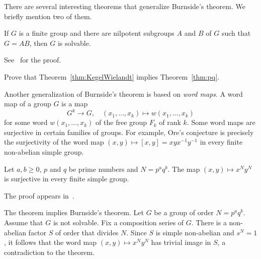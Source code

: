 
\begin{optional}
There are several interesting theorems that generalize Burnside’s theorem. 
We briefly mention two of them.

\begin{theorem}
    \label{thm:KegelWielandt}
    If $G$ is a finite group and there are nilpotent subgroups 
    $A$ and $B$ of $G$ such that 
    $G=AB$, then $G$ is solvable.
\end{theorem}

See~\cite[Theorem 2.4.3]{MR1211633} for the proof.

 \begin{xca}
     Prove that Theorem~\ref{thm:KegelWielandt} 
     implies Theorem~\ref{thm:pq}.
 \end{xca}

Another generalization of Burnside's theorem
is based on \emph{word maps}. A word map
of a group $G$ is a map 
\[
G^k\to G,\quad 
(x_1,\dots,x_k)\mapsto w(x_1,\dots,x_k)
\]
for some word $w(x_1,\dots,x_k)$ of the free group $F_k$ of rank $k$. 
Some word maps are surjective in certain families of groups. For example, 
Ore's conjecture is precisely the surjectivity of the word map
$(x,y)\mapsto [x,y]=xyx^{-1}y^{-1}$ in every finite non-abelian simple 
group. 

\begin{theorem}
    Let $a,b\geq0$, $p$ and $q$ be prime numbers and $N=p^aq^b$. The map 
    $(x,y)\mapsto x^Ny^N$ is surjective in every finite simple group. 
\end{theorem}

The proof appears in~\cite{MR3827208}. 

The theorem implies Burnside's theorem. Let $G$ be a group of order
$N=p^aq^b$. Assume that $G$ is not solvable. 
Fix a composition series of $G$. There is a non-abelian factor $S$ 
of order that divides $N$. Since 
$S$ is simple non-abelian and $s^N=1$, it follows that the word map
$(x,y)\mapsto x^Ny^N$ has trivial image in $S$, a contradiction 
to the theorem. 
\end{optional}


